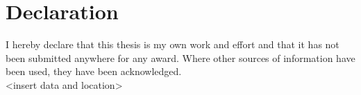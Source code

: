 
\chapter*{Declaration}
\thispagestyle{empty}
%
I hereby declare that this thesis is my own work and effort and that it has not
been submitted anywhere for any award. Where other sources of information have
been used, they have been acknowledged.
%
\mbox{}\vspace{4\baselineskip}\\
%
<insert data and location> 
\clearpage\mbox{}\thispagestyle{empty}


%

